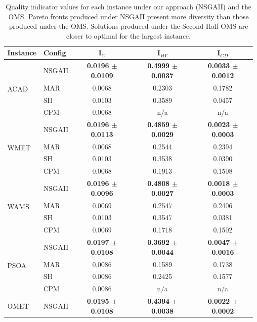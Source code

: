 \documentclass[conference]{IEEEtran}
\begin{document}
\begin{table}[htbp]
	\scriptsize
  \centering
  \caption{Quality indicator values for each instance under our approach (NSGAII) and the OMS. Pareto fronts produced under NSGAII present more diversity than those produced under the OMS. Solutions produced under the Second-Half OMS are closer to optimal for the largest instance.}
    \begin{tabular}{p{0.7cm} p{0.7cm} ccc}
    \toprule
    \textbf{Instance} & \textbf{Config} & \textbf{I$_{C}$} & \textbf{I$_{HV}$} & \textbf{I$_{GD}$} \\
    \midrule
    \multirow{4}[2]{*}{ACAD} & NSGAII & \textbf{0.0196 $\pm$ 0.0109} & \textbf{0.4999 $\pm$ 0.0037} & \textbf{0.0033 $\pm$ 0.0012} \\
          & MAR   & 0.0068 & 0.2303 & 0.1782 \\
          & SH    & 0.0103 & 0.3589 & 0.0457 \\
          & CPM   & 0.0068 &    n/a &    n/a \\\hline
    \multirow{4}[2]{*}{WMET} & NSGAII & \textbf{0.0196 $\pm$ 0.0113} & \textbf{0.4859 $\pm$ 0.0029} & \textbf{0.0023 $\pm$ 0.0003} \\
          & MAR   & 0.0068 & 0.2544 & 0.2394 \\
          & SH    & 0.0103 & 0.3538 & 0.0390 \\
          & CPM   & 0.0068 & 0.1913 & 0.1508 \\\hline
    \multirow{4}[2]{*}{WAMS} & NSGAII & \textbf{0.0196 $\pm$ 0.0096} & \textbf{0.4808 $\pm$ 0.0027} & \textbf{0.0018 $\pm$ 0.0003} \\
          & MAR   & 0.0069 & 0.2547 & 0.2406 \\
          & SH    & 0.0103 & 0.3547 & 0.0381 \\
          & CPM   & 0.0069 & 0.1718 & 0.1502 \\\hline
    \multirow{4}[2]{*}{PSOA} & NSGAII & \textbf{0.0197 $\pm$ 0.0108} & \textbf{0.3692 $\pm$ 0.0044} & \textbf{0.0047 $\pm$ 0.0016} \\
          & MAR   & 0.0086 & 0.1589 & 0.1738 \\
          & SH    & 0.0086 & 0.2425 & 0.1577 \\
          & CPM   & 0.0086 &    n/a &    n/a \\\hline
    \multirow{4}[2]{*}{OMET} & NSGAII & \textbf{0.0195 $\pm$ 0.0108} & \textbf{0.4394 $\pm$ 0.0038} & \textbf{0.0022 $\pm$ 0.0002} \\

\end{tabular}
\end{table}
\end{document}

